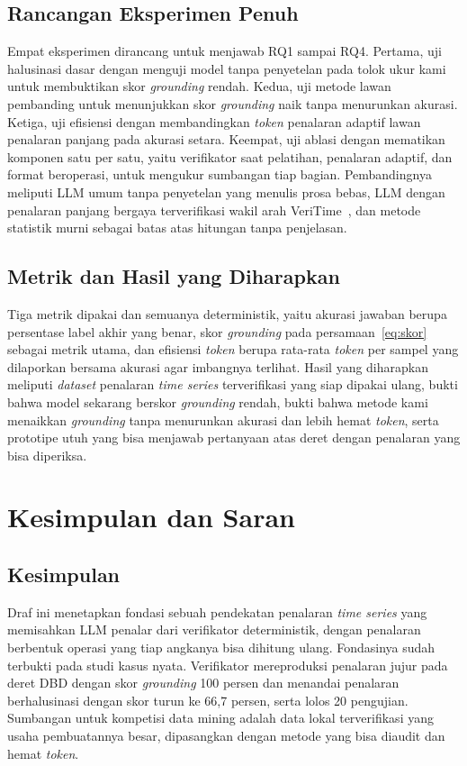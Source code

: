 \documentclass[10pt,a4paper,twocolumn]{article}
\begin{document}
\subsection{Rancangan Eksperimen Penuh}
Empat eksperimen dirancang untuk menjawab RQ1 sampai RQ4. Pertama, uji
halusinasi dasar dengan menguji model tanpa penyetelan pada tolok ukur kami
untuk membuktikan skor \textit{grounding} rendah. Kedua, uji metode lawan
pembanding untuk menunjukkan skor \textit{grounding} naik tanpa menurunkan
akurasi. Ketiga, uji efisiensi dengan membandingkan \textit{token} penalaran
adaptif lawan penalaran panjang pada akurasi setara. Keempat, uji ablasi dengan
mematikan komponen satu per satu, yaitu verifikator saat pelatihan, penalaran
adaptif, dan format beroperasi, untuk mengukur sumbangan tiap bagian.
Pembandingnya meliputi LLM umum tanpa penyetelan yang menulis prosa bebas, LLM
dengan penalaran panjang bergaya terverifikasi wakil arah
VeriTime~\cite{veritime2026}, dan metode statistik murni sebagai batas atas
hitungan tanpa penjelasan.

\subsection{Metrik dan Hasil yang Diharapkan}
Tiga metrik dipakai dan semuanya deterministik, yaitu akurasi jawaban berupa
persentase label akhir yang benar, skor \textit{grounding} pada
persamaan~\eqref{eq:skor} sebagai metrik utama, dan efisiensi \textit{token}
berupa rata-rata \textit{token} per sampel yang dilaporkan bersama akurasi agar
imbangnya terlihat. Hasil yang diharapkan meliputi \textit{dataset} penalaran
\textit{time series} terverifikasi yang siap dipakai ulang, bukti bahwa model
sekarang berskor \textit{grounding} rendah, bukti bahwa metode kami menaikkan
\textit{grounding} tanpa menurunkan akurasi dan lebih hemat \textit{token},
serta prototipe utuh yang bisa menjawab pertanyaan atas deret dengan penalaran
yang bisa diperiksa.

\section{Kesimpulan dan Saran}

\subsection{Kesimpulan}
Draf ini menetapkan fondasi sebuah pendekatan penalaran \textit{time series}
yang memisahkan LLM penalar dari verifikator deterministik, dengan penalaran
berbentuk operasi yang tiap angkanya bisa dihitung ulang. Fondasinya sudah
terbukti pada studi kasus nyata. Verifikator mereproduksi penalaran jujur pada
deret DBD dengan skor \textit{grounding} 100 persen dan menandai penalaran
berhalusinasi dengan skor turun ke 66,7 persen, serta lolos 20 pengujian.
Sumbangan untuk kompetisi data mining adalah data lokal terverifikasi yang usaha
pembuatannya besar, dipasangkan dengan metode yang bisa diaudit dan hemat
\textit{token}.
\end{document}
